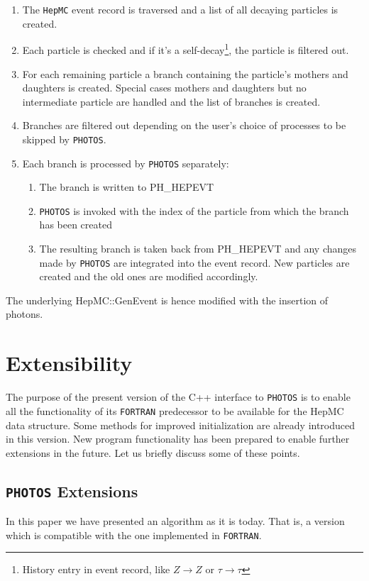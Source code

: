\documentclass[]{Photos_interface_design}
\begin{document}
\begin{enumerate}
\item The {\tt HepMC} event record is traversed and a list of all decaying
      particles is created.
\item Each particle is checked and if it's a self-decay\footnote{History entry in event record, like
      $Z\to Z$ or $\tau \to \tau$}, the particle is filtered out.
\item For each remaining particle a branch containing the particle's mothers and daughters
      is created. Special cases mothers and daughters but no intermediate particle are handled and the
	  list of branches is created.
\item Branches are filtered out depending on the user's choice of processes
      to be skipped by {\tt PHOTOS}.
\item Each branch is processed by {\tt PHOTOS} separately:

	\begin{enumerate}
  
	\item The branch is written to PH\_HEPEVT
	\item {\tt PHOTOS} is invoked with the index of the particle from which the branch
	      has been created
 	\item The resulting branch is taken back from PH\_HEPEVT and any changes made by {\tt PHOTOS} are 
           integrated into the event record. New particles are created and the old ones are modified
		  accordingly.

	\end{enumerate}

\end{enumerate}

The underlying HepMC::GenEvent is hence modified with the  insertion of photons.

\section{Extensibility}
\label{sec:extensibility}
 The purpose of the present version of the C++ interface to {\tt PHOTOS} is to enable 
all the functionality of its {\tt FORTRAN} predecessor to be available for the HepMC data
structure. Some methods for improved initialization are already introduced in this version. New program 
functionality has been prepared to enable further extensions in the future. 
Let us briefly discuss some of these points.

\subsection{{\tt PHOTOS} Extensions}
In this paper we have presented an algorithm as it is today. 
That is, a version which is compatible with the one implemented in {\tt FORTRAN}.
\end{document}
